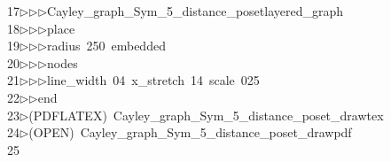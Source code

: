 \begin{tabbing}
17\>$\triangleright$\>$\triangleright$\>$\triangleright$\>Cayley\_graph\_Sym\_5\_distance\_posetlayered\_graph\ \\[0pt]
18\>$\triangleright$\>$\triangleright$\>$\triangleright$\>place\ \\[0pt]
19\>$\triangleright$\>$\triangleright$\>$\triangleright$\>radius\ 250\ embedded\ \\[0pt]
20\>$\triangleright$\>$\triangleright$\>$\triangleright$\>nodes\ \\[0pt]
21\>$\triangleright$\>$\triangleright$\>$\triangleright$\>line\_width\ 04\ x\_stretch\ 14\ scale\ 025\ \\[0pt]
22\>$\triangleright$\>$\triangleright$\>end\\[0pt]
23\>$\triangleright$\>(PDFLATEX)\ Cayley\_graph\_Sym\_5\_distance\_poset\_drawtex\\[0pt]
24\>$\triangleright$\>(OPEN)\ Cayley\_graph\_Sym\_5\_distance\_poset\_drawpdf\\[0pt]
25\>\end{tabbing}
